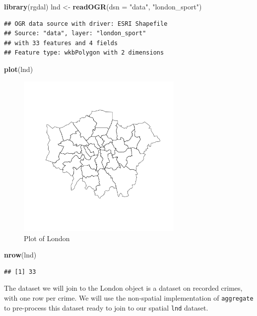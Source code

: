 \documentclass[]{article}
\newenvironment{Shaded}{}{}
\newcommand{\KeywordTok}[1]{\textcolor[rgb]{0.00,0.44,0.13}{\textbf{{#1}}}}
\newcommand{\DataTypeTok}[1]{\textcolor[rgb]{0.56,0.13,0.00}{{#1}}}
\newcommand{\StringTok}[1]{\textcolor[rgb]{0.25,0.44,0.63}{{#1}}}
\newcommand{\NormalTok}[1]{{#1}}
\let\Oldincludegraphics\includegraphics
\renewcommand{\includegraphics}[1]{\Oldincludegraphics[width=8cm]{#1}}
\begin{document}
\begin{Shaded}
\begin{Highlighting}[]
\KeywordTok{library}\NormalTok{(rgdal)}
\NormalTok{lnd <- }\KeywordTok{readOGR}\NormalTok{(}\DataTypeTok{dsn =} \StringTok{"data"}\NormalTok{, }\StringTok{"london_sport"}\NormalTok{)}
\end{Highlighting}
\end{Shaded}
\begin{verbatim}
## OGR data source with driver: ESRI Shapefile 
## Source: "data", layer: "london_sport"
## with 33 features and 4 fields
## Feature type: wkbPolygon with 2 dimensions
\end{verbatim}
\begin{Shaded}
\begin{Highlighting}[]
\KeywordTok{plot}\NormalTok{(lnd)}
\end{Highlighting}
\end{Shaded}
\begin{figure}[htbp]
\centering
\includegraphics{figure/Plot_of_London.png}
\caption{Plot of London}
\end{figure}

\begin{Shaded}
\begin{Highlighting}[]
\KeywordTok{nrow}\NormalTok{(lnd)}
\end{Highlighting}
\end{Shaded}
\begin{verbatim}
## [1] 33
\end{verbatim}
The dataset we will join to the London object is a dataset on recorded
crimes, with one row per crime. We will use the non-spatial
implementation of \texttt{aggregate} to pre-process this dataset ready
to join to our spatial \texttt{lnd} dataset.
\end{document}

